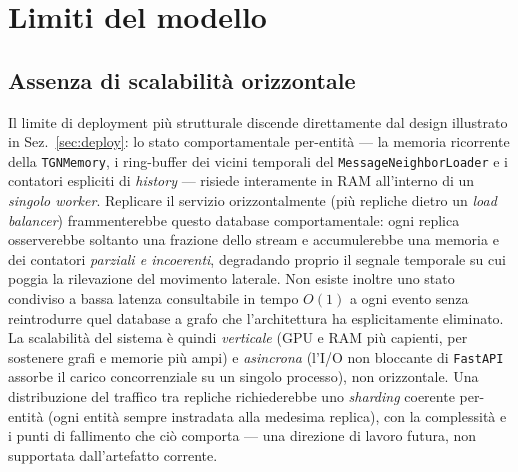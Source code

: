\documentclass[11pt,a4paper]{report}
\begin{document}
\section{Limiti del modello}
\label{sec:limiti}



\subsection{Assenza di scalabilità orizzontale}

Il limite di deployment più strutturale discende direttamente dal design illustrato in Sez.~\ref{sec:deploy}: lo stato comportamentale per-entità --- la memoria ricorrente della \texttt{TGNMemory}, i ring-buffer dei vicini temporali del \texttt{MessageNeighborLoader} e i contatori espliciti di \textit{history} --- risiede interamente in RAM all'interno di un \emph{singolo worker}. Replicare il servizio orizzontalmente (più repliche dietro un \textit{load balancer}) frammenterebbe questo database comportamentale: ogni replica osserverebbe soltanto una frazione dello stream e accumulerebbe una memoria e dei contatori \emph{parziali e incoerenti}, degradando proprio il segnale temporale su cui poggia la rilevazione del movimento laterale. Non esiste inoltre uno stato condiviso a bassa latenza consultabile in tempo $O(1)$ a ogni evento senza reintrodurre quel database a grafo che l'architettura ha esplicitamente eliminato. La scalabilità del sistema è quindi \emph{verticale} (GPU e RAM più capienti, per sostenere grafi e memorie più ampi) e \emph{asincrona} (l'I/O non bloccante di \texttt{FastAPI} assorbe il carico concorrenziale su un singolo processo), non orizzontale. Una distribuzione del traffico tra repliche richiederebbe uno \textit{sharding} coerente per-entità (ogni entità sempre instradata alla medesima replica), con la complessità e i punti di fallimento che ciò comporta --- una direzione di lavoro futura, non supportata dall'artefatto corrente.
\end{document}
